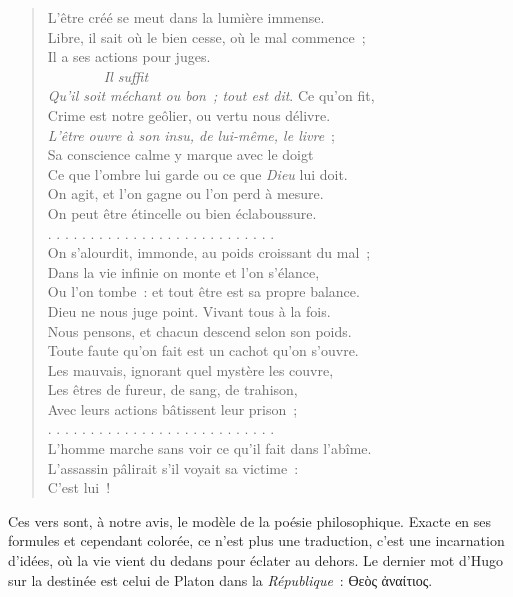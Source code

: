 \documentclass[french,twoside]{book} %
\begin{document}
\begin{verse}
L’être créé se meut dans la lumière immense.\\
Libre, il sait où le bien cesse, où le mal commence ;\\
Il a ses actions pour juges.\\
        \emph{Il suffit}\\
\emph{Qu’il soit méchant ou bon ; tout est dit}. Ce qu’on fit,\\
Crime est notre geôlier, ou vertu nous délivre.\\
\emph{L’être ouvre à son insu, de lui-même, le livre} ;\\
Sa conscience calme y marque avec le doigt\\
Ce que l’ombre lui garde ou ce que \emph{Dieu} lui doit.\\
On agit, et l’on gagne ou l’on perd à mesure.\\
On peut être étincelle ou bien éclaboussure.\\
. . . . . . . . . . . . . . . . . . . . . . . . . . .\\
On s’alourdit, immonde, au poids croissant du mal ;\\
Dans la vie infinie on monte et l’on s’élance,\\
Ou l’on tombe : et tout être est sa propre balance.\\
Dieu ne nous juge point. Vivant tous à la fois.\\
Nous pensons, et chacun descend selon son poids.\\
Toute faute qu’on fait est un cachot qu’on s’ouvre.\\
Les mauvais, ignorant quel mystère les couvre,\\
Les êtres de fureur, de sang, de trahison,\\
Avec leurs actions bâtissent leur prison ;\\
. . . . . . . . . . . . . . . . . . . . . . . . . . .\\
L’homme marche sans voir ce qu’il fait dans l’abîme.\\
L’assassin pâlirait s’il voyait sa victime :\\
C’est lui !\\
\end{verse}

\noindent Ces vers sont, à notre avis, le modèle de la poésie philosophique. Exacte en ses formules et cependant colorée, ce n’est plus une traduction, c’est une incarnation d’idées, où la vie vient du dedans pour éclater au dehors. Le dernier mot d’Hugo sur la destinée est celui de Platon dans la \emph{République} : ϴεὸς ἀναίτιος.\par
\end{document}
